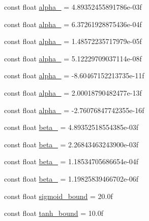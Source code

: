 \begin{DoxyCompactItemize}
\item 
const float \mbox{\hyperlink{namespaceonnxruntime_1_1rnn_1_1detail_1_1deepcpu_a4154e74f0cb2dfec9e757e9f5711852b}{alpha\+\_}} = 4.\+89352455891786e-\/03f
\item 
const float \mbox{\hyperlink{namespaceonnxruntime_1_1rnn_1_1detail_1_1deepcpu_ab9b55fe6a85d7c18fc0feb3025e90a88}{alpha\+\_}} = 6.\+37261928875436e-\/04f
\item 
const float \mbox{\hyperlink{namespaceonnxruntime_1_1rnn_1_1detail_1_1deepcpu_ac3f505a29030ea4f67231c1c19366d06}{alpha\+\_}} = 1.\+48572235717979e-\/05f
\item 
const float \mbox{\hyperlink{namespaceonnxruntime_1_1rnn_1_1detail_1_1deepcpu_a052d505a0bb4c2a69037877e0499b965}{alpha\+\_}} = 5.\+12229709037114e-\/08f
\item 
const float \mbox{\hyperlink{namespaceonnxruntime_1_1rnn_1_1detail_1_1deepcpu_afdded6f83ed73bbcd27bd90abab6a202}{alpha\+\_}} = -\/8.\+60467152213735e-\/11f
\item 
const float \mbox{\hyperlink{namespaceonnxruntime_1_1rnn_1_1detail_1_1deepcpu_a0935025c2ccffdf953a545ace9496992}{alpha\+\_}} = 2.\+00018790482477e-\/13f
\item 
const float \mbox{\hyperlink{namespaceonnxruntime_1_1rnn_1_1detail_1_1deepcpu_a61d9a3b62bffdbdf5c89fd6d9124e43c}{alpha\+\_}} = -\/2.\+76076847742355e-\/16f
\item 
const float \mbox{\hyperlink{namespaceonnxruntime_1_1rnn_1_1detail_1_1deepcpu_a0ad5d1492edf9db329b66c7e822bffbd}{beta\+\_}} = 4.\+89352518554385e-\/03f
\item 
const float \mbox{\hyperlink{namespaceonnxruntime_1_1rnn_1_1detail_1_1deepcpu_a92da2bcd7e3c3e092ac24bbd6630f2f2}{beta\+\_}} = 2.\+26843463243900e-\/03f
\item 
const float \mbox{\hyperlink{namespaceonnxruntime_1_1rnn_1_1detail_1_1deepcpu_a445505f7bbf83b7c36790df4c93edcc4}{beta\+\_}} = 1.\+18534705686654e-\/04f
\item 
const float \mbox{\hyperlink{namespaceonnxruntime_1_1rnn_1_1detail_1_1deepcpu_aa4b4fe678d7989e1dfd0ade43ef542fb}{beta\+\_}} = 1.\+19825839466702e-\/06f
\item 
const float \mbox{\hyperlink{namespaceonnxruntime_1_1rnn_1_1detail_1_1deepcpu_acec36c5e955a487bbbe5886ad123d4c4}{sigmoid\+\_\+bound}} = 20.\+0f
\item 
const float \mbox{\hyperlink{namespaceonnxruntime_1_1rnn_1_1detail_1_1deepcpu_ac06b1c48ef7654bd1fd35a1f9f0d0bee}{tanh\+\_\+bound}} = 10.\+0f
\end{DoxyCompactItemize}


